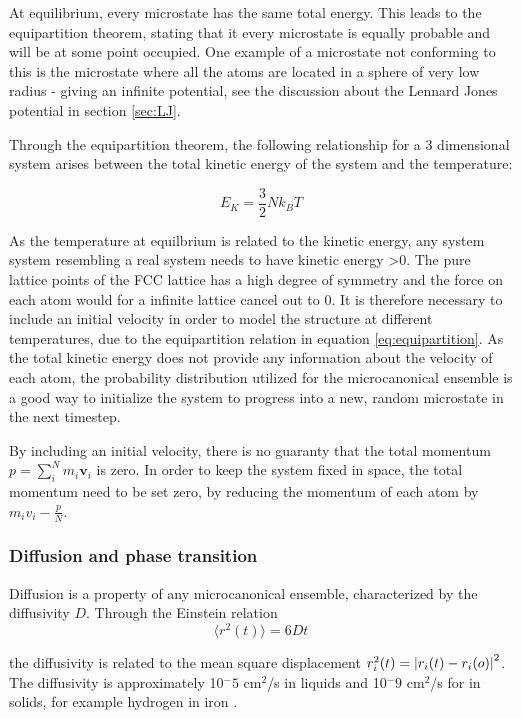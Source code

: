 At equilibrium, every microstate has the same total energy. This leads to  the equipartition theorem, stating that it every microstate is equally probable and will be at some point occupied. One example of a microstate not conforming to this is the microstate where all the atoms are located in a sphere of very low radius - giving an infinite potential, see the discussion about the Lennard Jones potential in section \ref{sec:LJ}. 

Through the equipartition theorem, the following relationship for a 3 dimensional system arises between the total kinetic energy of the system and the temperature:

\begin{equation}\label{eq:equipartition}
E_K = \frac{3	}{2}Nk_BT
\end{equation}

As the temperature at equilbrium is related to the kinetic energy, any system system resembling a real system needs to have kinetic energy >0. The pure lattice points of the FCC lattice has a high degree of symmetry and the force on each atom would for a infinite lattice cancel out to 0. It is therefore necessary to include an initial velocity in order to model the structure at different temperatures, due to the equipartition relation in equation \ref{eq:equipartition}. As the total kinetic energy does not provide any information about the velocity of each atom, the probability distribution utilized for the microcanonical ensemble is a good way to initialize the system to progress into a new, random microstate in the next timestep. 

By including an initial velocity, there is no guaranty that the total momentum $ p = \sum\limits_{i}^{N} m_i\textbf{v}_i $ is zero. In order to keep the system fixed in space, the total momentum need to be set zero, by reducing the momentum of each atom by $ m_iv_i - \frac{p}{N}$. 

\subsubsection{Diffusion and phase transition}
Diffusion is a property of any microcanonical ensemble, characterized by the diffusivity $ D $. Through the Einstein relation
\begin{equation}\label{eq:Einstein}
\langle r^2(t) \rangle = 6Dt
\end{equation}

the diffusivity is related to the mean square displacement $ r_i^2(t) = \abs{r_i(t) - r_i(o)}^2 $. The diffusivity is approximately 10$^-5$ cm$^2$/s in liquids and 10$^-9$ cm$^2$/s for in solids, for example hydrogen in iron \cite{wiki_diff}. 

